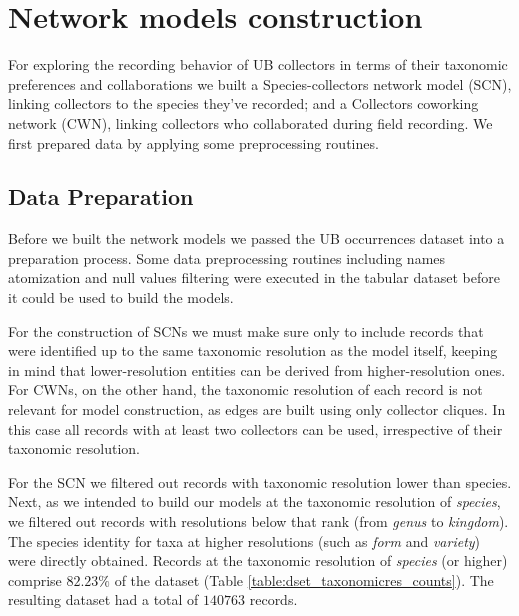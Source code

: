 \section{Network models construction}



For exploring the recording behavior of UB collectors in terms of their taxonomic preferences and collaborations we built a Species-collectors network model (SCN), linking collectors to the species they've recorded; and a Collectors coworking network (CWN), linking collectors who collaborated during field recording.
We first prepared data by applying some preprocessing routines.

\subsection{Data Preparation} \label{section:ub_data_preparation}
Before we built the network models we passed the UB occurrences dataset into a preparation process.
Some data preprocessing routines including names atomization and null values filtering were executed in the tabular dataset before it could be used to build the models. 

For the construction of SCNs we must make sure only to include records that were identified up to the same taxonomic resolution as the model itself, keeping in mind that lower-resolution entities can be derived from higher-resolution ones. 
For CWNs, on the other hand, the taxonomic resolution of each record is not relevant for model construction, as edges are built using only collector cliques. In this case all records with at least two collectors can be used, irrespective of their taxonomic resolution.

For the SCN we filtered out records with taxonomic resolution lower than species.
Next, as we intended to build our models at the taxonomic resolution of \textit{species}, we filtered out records with resolutions below that rank (from \textit{genus} to \textit{kingdom}). 
The species identity for taxa at higher resolutions (such as \textit{form} and \textit{variety}) were directly obtained. 
Records at the taxonomic resolution of \textit{species} (or higher) comprise $82.23\%$ of the dataset (Table \ref{table:dset_taxonomicres_counts}).
The resulting dataset had a total of $140763$ records. 

